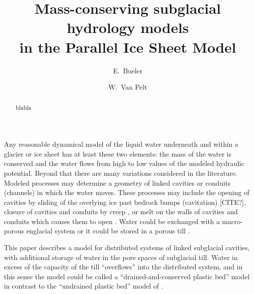 \documentclass[gmd]{copernicus}   %
\begin{document}
\graphicspath{{figs/}}

\linenumbers

\title{Mass-conserving subglacial hydrology models \\ in the Parallel Ice Sheet Model}


\author[1]{E.~Bueler}
\author[2]{W.~Van Pelt}





\received{}
\pubdiscuss{} %
\revised{}
\accepted{}
\published{}


\maketitle

\begin{abstract}
blabla
\end{abstract}

\introduction

Any reasonable dynamical model of the liquid water underneath and within a glacier or ice sheet has at least these two elements: the mass of the water is conserved and the water flows from high to low values of the modeled hydraulic potential.  Beyond that there are many variations considered in the literature.  Modeled processes may determine a geometry of linked cavities \citep{Kamb1987} or conduits (channels) \citep{Nye1976} in which the water moves.  These processes may include the opening of cavities by sliding of the overlying ice past bedrock bumps (cavitation) [CITE?], closure of cavities and conduits by creep \citep{Hewitt2011}, or melt on the walls of cavities and conduits which causes them to open \citep{Clarke05}.  Water could be exchanged with a macro-porous englacial system \citep{Bartholomausetal2011,Harperetal2010} or it could be stored in a porous till \citep{Tulaczyketal2000}.

This paper describes a model for distributed systems of linked subglacial cavities, with additional storage of water in the pore spaces of subglacial till.  Water in excess of the capacity of the till ``overflows'' into the distributed system, and in this sense the model could be called a ``drained-and-conserved plastic bed'' model in contrast to the ``undrained plastic bed'' model of \cite{Tulaczyketal2000b}.
\end{document}
